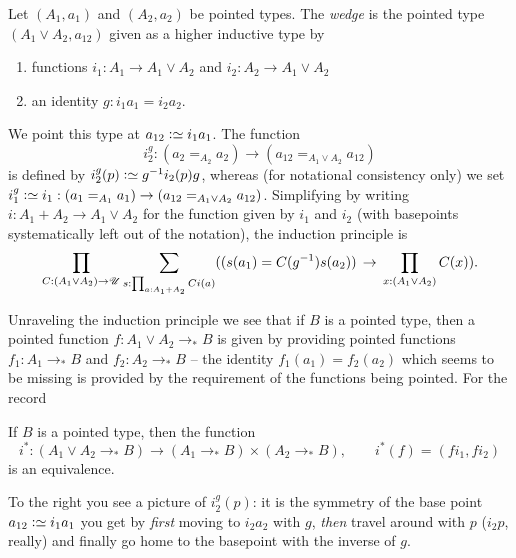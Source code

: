 \begin{definition}
  \label{def:wedge}
  Let $(A_1,a_1)$ and $(A_2,a_2)$ be pointed types.  The \emph{wedge} is the pointed type $(A_1\vee A_2,a_{12})$ given as a higher inductive type by
  \begin{enumerate}
  \item functions $i_1:A_1\to A_1\vee A_2$ and $i_2:A_2\to A_1\vee A_2$
  \item an identity $g:i_1a_1=i_2a_2$.
  \end{enumerate}
We point this type at $a_{12}\defequi i_1a_1$.
  The function
$$i^g_2:(a_2=_{A_2}a_2)\to(a_{12}=_{A_1\vee A_2}a_{12})$$
is defined by $i^g_2(p)\defequi g^{-1}i_2(p)g$, whereas (for notational consistency only) we set $i_1^g\defequi i_1:(a_1=_{A_1}a_1)\to(a_{12}=_{A_1\vee A_2}a_{12})$.
Simplifying by writing $i:A_1+A_2\to A_1\vee A_2$ for the function given by $i_1$ and $i_2$ (with basepoints systematically left out of the notation),
the induction principle is
$$\prod_{C:(A_1\vee A_2)\to{\mathscr{U}}}\sum_{s:\prod_{a:A_1+A_2}Ci(a)}
((s(a_1)=C(g^{-1})s(a_2))\,\to\,\prod_{x:(A_1\vee A_2)}C(x)).$$
\end{definition}

Unraveling the induction principle we see that if $B$ is a pointed type, then a  pointed function $f:A_1\vee A_2\to_* B$ is given by providing pointed functions $f_1:A_1\to_* B$ and $f_2:A_2\to_* B$  -- the identity $f_1(a_1)=f_2(a_2)$ which seems to be missing is provided by the requirement of the functions being pointed.  For the record
\begin{lemma}
  \label{lem:univvee}
  If $B$ is a pointed type, then the function
  $$i^*:(A_1\vee A_2\to_*B)\to(A_1\to_*B)\times(A_2\to_*B),\qquad i^*(f)=(fi_1,fi_2)
$$
is an equivalence.
\end{lemma}



To the right you see a picture of $i_2^g(p)$: it is the symmetry of the base point $a_{12}\defequi i_1a_1$ you get by \emph{first} moving to $i_2a_2$ with $g$, \emph{then} travel around with $p$ ($i_2p$, really) and finally go home to the basepoint with the inverse of $g$.

